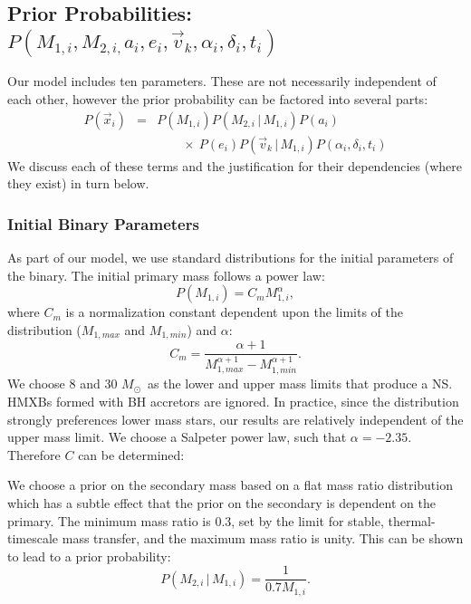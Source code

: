 \documentclass[12pt, preprint]{aastex}
\newcommand{\given}{\,|\,}
\newcommand{\Msun}{\ifmmode {M_{\odot}}\else${M_{\odot}}$\fi}
\begin{document}
\subsection{Prior Probabilities: $P(M_{1,i}, M_{2,i,} a_i, e_i, \vec{v}_k, \alpha_i, \delta_i, t_i)$} \label{sec:priors}

Our model includes ten parameters. These are not necessarily independent of each other, however the prior probability can be factored into several parts:
\begin{eqnarray}
P(\vec{x}_i) &=& P(M_{1,i}) P(M_{2,i}\given M_{1,i}) P(a_i) \nonumber \\
 & & \qquad  \times\ P(e_i) P(\vec{v}_k \given M_{1,i}) P(\alpha_i, \delta_i, t_i)
\end{eqnarray}
We discuss each of these terms and the justification for their dependencies (where they exist) in turn below.

\subsubsection{Initial Binary Parameters}

As part of our model, we use standard distributions for the initial parameters of the binary. The initial primary mass follows a power law:
\begin{equation}
P(M_{1,i}) = C_m M_{1,i}^{\alpha},
\end{equation}
where $C_m$ is a normalization constant dependent upon the limits of the distribution ($M_{1,max}$ and $M_{1,min}$) and $\alpha$:
\begin{equation}
C_m = \frac{\alpha + 1}{M_{1,max}^{\alpha+1} - M_{1,min}^{\alpha+1}}.
\end{equation}
We choose 8 and 30 \Msun\ as the lower and upper mass limits that produce a NS. HMXBs formed with BH accretors are ignored. In practice, since the distribution strongly preferences lower mass stars, our results are relatively independent of the upper mass limit. We choose a Salpeter power law, such that $\alpha = -2.35$. Therefore $C$ can be determined:

We choose a prior on the secondary mass based on a flat mass ratio distribution which has a subtle effect that the prior on the secondary is dependent on the primary. The minimum mass ratio is 0.3, set by the limit for stable, thermal-timescale mass transfer, and the maximum mass ratio is unity. This can be shown to lead to a prior probability:
\begin{equation}
P(M_{2,i} \given M_{1,i}) = \frac{1}{0.7 M_{1,i}}.
\end{equation}
\end{document}
